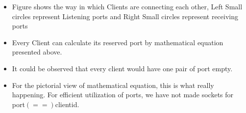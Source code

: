 \documentclass[12pt]{scrartcl}
\begin{document}
\begin{center}
\begin{tikzpicture}
        
        
        
    \end{tikzpicture}
    \end{center}
\begin{itemize}
    \item Figure shows the way in which Clients are connecting each other, Left Small circles represent Listening ports and Right Small circles represent receiving ports
    \item Every Client can calculate its reserved port by mathematical equation presented above. 
    \item It could be observed that every client would have one pair of port empty.
    \item For the pictorial view of mathematical equation, this is what really happening. For efficient utilization of ports, we have not made sockets for port$(==)$clientid.
\end{itemize}
\end{document}
